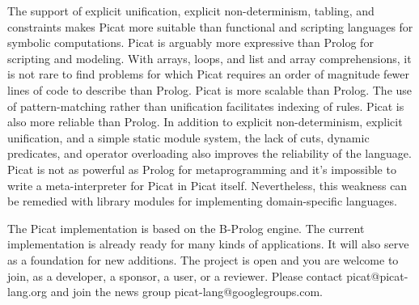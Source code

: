 The support of explicit unification, explicit non-determinism, tabling, and constraints makes Picat more suitable than functional and scripting languages for symbolic computations. Picat is arguably more expressive than Prolog for scripting and modeling. With arrays, loops, and list and array comprehensions, it is not rare to find problems for which Picat requires an order of magnitude fewer lines of code to describe than Prolog. Picat is more scalable than Prolog. The use of pattern-matching rather than unification facilitates indexing of rules. Picat is also more reliable than Prolog. In addition to explicit non-determinism, explicit unification, and a simple static module system, the lack of cuts, dynamic predicates, and operator overloading also improves the reliability of the language. Picat is not as powerful as Prolog for metaprogramming and it's impossible to write a meta-interpreter for Picat in Picat itself. Nevertheless, this weakness can be remedied with library modules for implementing domain-specific languages.

The Picat implementation is based on the B-Prolog engine. The current implementation is already ready for many kinds of applications. It will also serve as a foundation for new additions. The project is open and you are welcome to join, as a developer, a sponsor, a user, or a reviewer. Please contact picat@picat-lang.org and join the news group picat-lang@googlegroups.com. 
